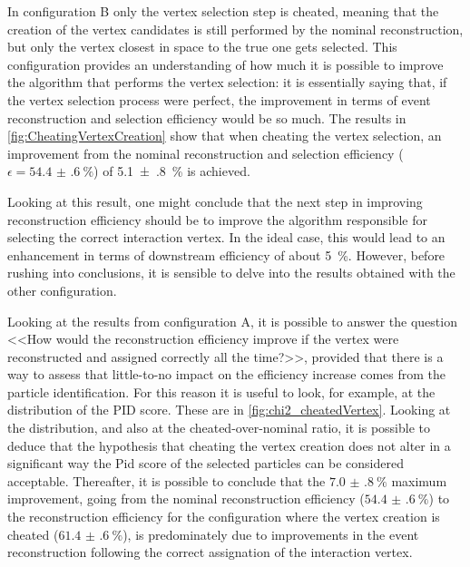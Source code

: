 In configuration B only the vertex selection step is cheated, meaning that the creation of the vertex candidates is still performed by the nominal reconstruction, but only the vertex closest in space to the true one gets selected. This configuration provides an understanding of how much it is possible to improve the algorithm that performs the vertex selection: it is essentially saying that, if the vertex selection process were perfect, the improvement in terms of event reconstruction and selection efficiency would be so much. The results in \autoref{fig:CheatingVertexCreation} show that when cheating the vertex selection, an improvement from the nominal reconstruction and selection efficiency ($\epsilon = \SI{54.4(6)}{\percent}$) of \SI{5.1(8)}{\percent} is achieved. 

Looking at this result, one might conclude that the next step in improving reconstruction efficiency should be to improve the algorithm responsible for selecting the correct interaction vertex. In the ideal case, this would lead to an enhancement in terms of downstream efficiency of about \SI{5}{\percent}. However, before rushing into conclusions, it is sensible to delve into the results obtained with the other configuration. 

Looking at the results from configuration A, it is possible to answer the question <<How would the reconstruction efficiency improve if the vertex were reconstructed and assigned correctly all the time?>>, provided that there is a way to assess that little-to-no impact on the efficiency increase comes from the particle identification. For this reason it  is useful to look, for example, at the distribution of the PID score. These are in \autoref{fig:chi2_cheatedVertex}. Looking at the distribution, and also at the cheated-over-nominal ratio, it is possible to deduce that the hypothesis that cheating the vertex creation does not alter in a significant way the Pid score of the selected particles can be considered acceptable. Thereafter, it is possible to conclude that the $\SI{7.0(8)}{\percent}$ maximum improvement, going from the nominal reconstruction efficiency ($\SI{54.4(6)}{\percent}$) to the reconstruction efficiency for the configuration where the vertex creation is cheated ($\SI{61.4(6)}{\percent}$), is predominately due to improvements in the event reconstruction following the correct assignation of the interaction vertex. 


